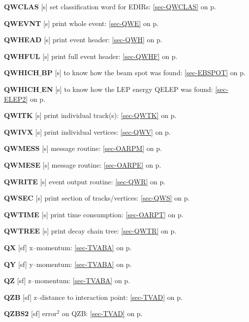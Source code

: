  \item{\bf QWCLAS  }[s] set classification word for EDIRs: \ref{sec-QWCLAS} on p.~\pageref{sec-QWCLAS}\\
 \item{\bf QWEVNT  }[s] print whole event: \ref{sec-QWE} on p.~\pageref{sec-QWE}\\
 \item{\bf QWHEAD  }[s] print event header: \ref{sec-QWH} on p.~\pageref{sec-QWH}\\
 \item{\bf QWHFUL  }[s] print full event
 header: \ref{sec-QWHF} on p.~\pageref{sec-QWHF}\\
 \item{\bf QWHICH$\_$BP  }[s] to know how the beam spot was found:
  \ref{sec-EBSPOT} on p.~\pageref{sec-EBSPOT}\\
 \item{\bf QWHICH$\_$EN  }[s] to know how the LEP energy QELEP was found:
  \ref{sec-ELEP2} on p.~\pageref{sec-ELEP2}\\
 \item{\bf QWITK   }[s] print individual track(s): \ref{sec-QWTK} on p.~\pageref{sec-QWTK}\\
 \item{\bf QWIVX   }[s] print individual vertices: \ref{sec-QWV} on p.~\pageref{sec-QWV}\\
 \item{\bf QWMESS  }[s] message routine: \ref{sec-OARPM} on p.~\pageref{sec-OARPM}\\
 \item{\bf QWMESE  }[s] message routine: \ref{sec-OARPE} on p.~\pageref{sec-OARPE}\\
 \item{\bf QWRITE  }[s] event output routine: \ref{sec-QWR} on p.~\pageref{sec-QWR}\\
 \item{\bf QWSEC   }[s] print section of tracks/vertices: \ref{sec-QWS} on p.~\pageref{sec-QWS}\\
 \item{\bf QWTIME  }[s] print time consumption: \ref{sec-OARPT} on p.~\pageref{sec-OARPT}\\
 \item{\bf QWTREE  }[s] print decay chain tree: \ref{sec-QWTR} on p.~\pageref{sec-QWTR}\\
 \item{\bf QX      }[sf] x--momentum: \ref{sec-TVABA} on p.~\pageref{sec-TVABA}\\
 \item{\bf QY      }[sf] y--momentum: \ref{sec-TVABA} on p.~\pageref{sec-TVABA}\\
 \item{\bf QZ      }[sf] z--momentum: \ref{sec-TVABA} on p.~\pageref{sec-TVABA}\\
 \item{\bf QZB     }[sf] z--distance to interaction point: \ref{sec-TVAD} on p.~\pageref{sec-TVAD}\\
 \item{\bf QZBS2   }[sf] error$^2$ on QZB: \ref{sec-TVAD} on p.~\pageref{sec-TVAD}
 
